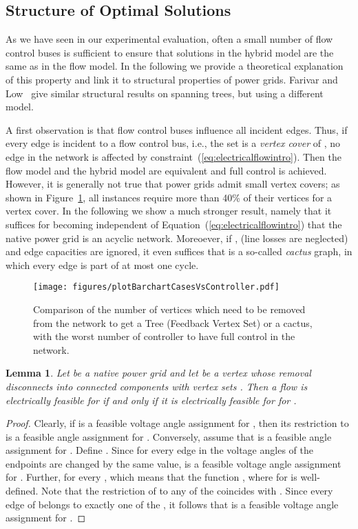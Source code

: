 \documentclass{article}[11pt,a4paper]
\newtheorem{lemma}[theorem]{Lemma}
\newcommand{\plotscaleOne}{0.45}
\begin{document}
\subsection{Structure of Optimal Solutions}
\label{sub:hybridtheory}
As we have seen in our experimental evaluation, often a small number
of flow control buses is sufficient to ensure that solutions in the hybrid
model are the same as in the flow model.  In the following we provide
a theoretical explanation of this property and link it to structural
properties of power grids. Farivar and Low~\cite{6507352} give similar structural 
results on spanning trees, but using a different model.

A first observation is that flow control buses influence all
incident edges.  Thus, if every edge is incident to a flow control bus, i.e., the set  is a \emph{vertex cover} of , no
edge in the network is affected by
constraint~(\ref{eq:electricalflowintro}).  Then the flow model and
the hybrid model are equivalent and full control is achieved.
However, it is generally not true that power grids admit small vertex
covers; as shown in Figure~\ref{fig:barchart-cases-controller}, all
instances require more than 40\% of their vertices for a vertex cover.
In the following we show a much stronger result, namely that it
suffices for becoming independent of 
Equation~(\ref{eq:electricalflowintro}) that the native power grid
 is an acyclic network.  Moreoever, if , (line
losses are neglected) and edge capacities are ignored, it even
suffices that  is a so-called \emph{cactus} graph, in which every
edge is part of at most one cycle.
\begin{figure}[tb!]
  	\centering
\texttt{[image: figures/plotBarchartCasesVsController.pdf]}
    \caption{Comparison of the number of vertices which need to be
      removed from the network to get a Tree (Feedback Vertex Set) or
      a cactus, with the worst number of controller to have full
      control in the network.}
	\label{fig:barchart-cases-controller}
\end{figure}
\begin{lemma}
  \label{lem:decompose-powergrid-cutvertex}
  Let  be a native power grid and let  be a vertex whose
  removal disconnects  into connected components with vertex sets
  .  Then a flow  is electrically feasible for 
  if and only if it is electrically feasible for  for .
\end{lemma}
\begin{proof}
  Clearly, if  is a feasible voltage angle assignment for , then its
  restriction to  is a feasible angle assignment for .
  Conversely, assume that  is a feasible angle assignment for
  .  Define .  
  Since for
  every edge in  the voltage angles of the endpoints are changed by the same value,
    is a feasible voltage angle assignment for .
  Further,  for every , which means that the function , where  for  is well-defined.
  Note that the restriction of  to any of the  coincides
  with .  Since every edge of  belongs to exactly one of
  the , it follows that  is a feasible voltage angle assignment for .
\end{proof}
\end{document}
